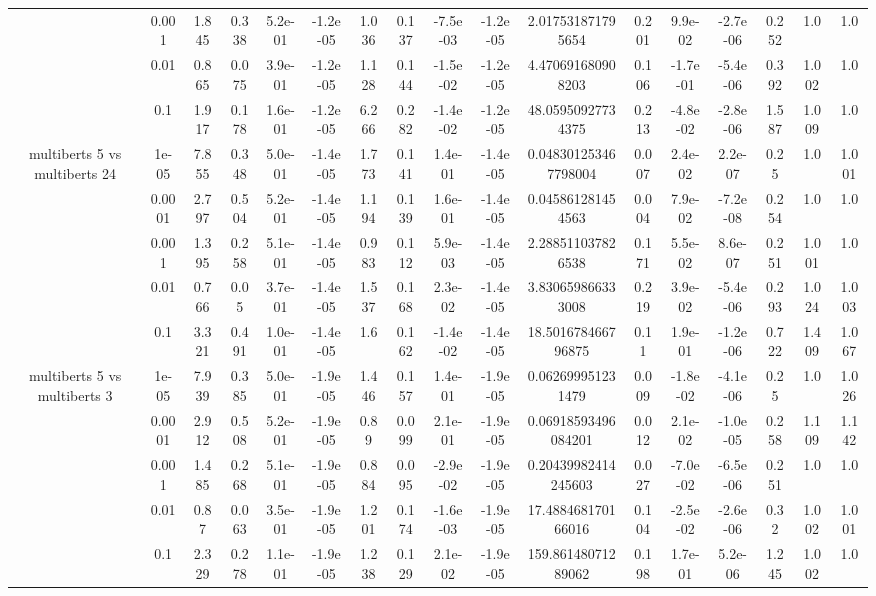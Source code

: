 \begin{tabular}{|c|c|c|c|c|c|c|c|c|c|c|c|c|c|c|c|c|}
 & 0.001 & 1.845 & 0.338 & 5.2e-01 & -1.2e-05 & 1.036 & 0.137 & -7.5e-03 & -1.2e-05 & 2.017531871795654 & 0.201 & 9.9e-02 & -2.7e-06 & 0.252 & 1.0 & 1.0 \\
 & 0.01 & 0.865 & 0.075 & 3.9e-01 & -1.2e-05 & 1.128 & 0.144 & -1.5e-02 & -1.2e-05 & 4.470691680908203 & 0.106 & -1.7e-01 & -5.4e-06 & 0.392 & 1.002 & 1.0 \\
 & 0.1 & 1.917 & 0.178 & 1.6e-01 & -1.2e-05 & 6.266 & 0.282 & -1.4e-02 & -1.2e-05 & 48.05950927734375 & 0.213 & -4.8e-02 & -2.8e-06 & 1.587 & 1.009 & 1.0 \\
\hline
\multirow{5}{*}{multiberts 5 vs multiberts 24} & 1e-05 & 7.855 & 0.348 & 5.0e-01 & -1.4e-05 & 1.773 & 0.141 & 1.4e-01 & -1.4e-05 & 0.048301253467798004 & 0.007 & 2.4e-02 & 2.2e-07 & 0.25 & 1.0 & 1.001 \\
 & 0.0001 & 2.797 & 0.504 & 5.2e-01 & -1.4e-05 & 1.194 & 0.139 & 1.6e-01 & -1.4e-05 & 0.045861281454563 & 0.004 & 7.9e-02 & -7.2e-08 & 0.254 & 1.0 & 1.0 \\
 & 0.001 & 1.395 & 0.258 & 5.1e-01 & -1.4e-05 & 0.983 & 0.112 & 5.9e-03 & -1.4e-05 & 2.288511037826538 & 0.171 & 5.5e-02 & 8.6e-07 & 0.251 & 1.001 & 1.0 \\
 & 0.01 & 0.766 & 0.05 & 3.7e-01 & -1.4e-05 & 1.537 & 0.168 & 2.3e-02 & -1.4e-05 & 3.830659866333008 & 0.219 & 3.9e-02 & -5.4e-06 & 0.293 & 1.024 & 1.003 \\
 & 0.1 & 3.321 & 0.491 & 1.0e-01 & -1.4e-05 & 1.6 & 0.162 & -1.4e-02 & -1.4e-05 & 18.501678466796875 & 0.11 & 1.9e-01 & -1.2e-06 & 0.722 & 1.409 & 1.067 \\
\hline
\multirow{5}{*}{multiberts 5 vs multiberts 3} & 1e-05 & 7.939 & 0.385 & 5.0e-01 & -1.9e-05 & 1.446 & 0.157 & 1.4e-01 & -1.9e-05 & 0.062699951231479 & 0.009 & -1.8e-02 & -4.1e-06 & 0.25 & 1.0 & 1.026 \\
 & 0.0001 & 2.912 & 0.508 & 5.2e-01 & -1.9e-05 & 0.89 & 0.099 & 2.1e-01 & -1.9e-05 & 0.06918593496084201 & 0.012 & 2.1e-02 & -1.0e-05 & 0.258 & 1.109 & 1.142 \\
 & 0.001 & 1.485 & 0.268 & 5.1e-01 & -1.9e-05 & 0.884 & 0.095 & -2.9e-02 & -1.9e-05 & 0.20439982414245603 & 0.027 & -7.0e-02 & -6.5e-06 & 0.251 & 1.0 & 1.0 \\
 & 0.01 & 0.87 & 0.063 & 3.5e-01 & -1.9e-05 & 1.201 & 0.174 & -1.6e-03 & -1.9e-05 & 17.488468170166016 & 0.104 & -2.5e-02 & -2.6e-06 & 0.32 & 1.002 & 1.001 \\
 & 0.1 & 2.329 & 0.278 & 1.1e-01 & -1.9e-05 & 1.238 & 0.129 & 2.1e-02 & -1.9e-05 & 159.86148071289062 & 0.198 & 1.7e-01 & 5.2e-06 & 1.245 & 1.002 & 1.0 \\

\end{tabular}
